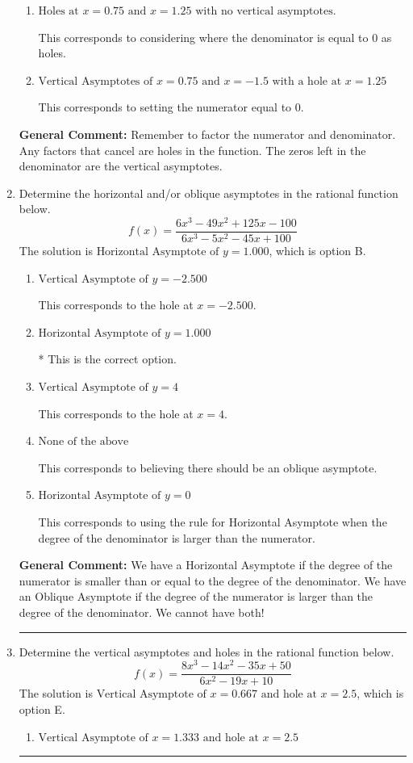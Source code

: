 \documentclass{extbook}[14pt]
\newcommand{\litem}[1]{\item #1

\rule{\textwidth}{0.4pt}}
\begin{document}
\begin{enumerate}
{\begin{enumerate}[label=\Alph*.]
This corresponds to mixing vertical and horizontal asymptotes.
\item \( \text{Holes at } x = 0.75 \text{ and } x = 1.25 \text{ with no vertical asymptotes.} \)

This corresponds to considering where the denominator is equal to 0 as holes.
\item \( \text{Vertical Asymptotes of } x = 0.75 \text{ and } x = -1.5 \text{ with a hole at } x = 1.25 \)

This corresponds to setting the numerator equal to 0.
\end{enumerate}

\textbf{General Comment:} Remember to factor the numerator and denominator. Any factors that cancel are holes in the function. The zeros left in the denominator are the vertical asymptotes.
}
\litem{
Determine the horizontal and/or oblique asymptotes in the rational function below.
\[ f(x) = \frac{6x^{3} -49 x^{2} +125 x -100}{6x^{3} -5 x^{2} -45 x + 100} \]The solution is \( \text{Horizontal Asymptote of } y = 1.000  \), which is option B.\begin{enumerate}[label=\Alph*.]
\item \( \text{Vertical Asymptote of } y = -2.500  \)

This corresponds to the hole at $x = -2.500$.
\item \( \text{Horizontal Asymptote of } y = 1.000  \)

* This is the correct option.
\item \( \text{Vertical Asymptote of } y = 4  \)

This corresponds to the hole at $x = 4$.
\item \( \text{None of the above} \)

This corresponds to believing there should be an oblique asymptote.
\item \( \text{Horizontal Asymptote of } y = 0  \)

This corresponds to using the rule for Horizontal Asymptote when the degree of the denominator is larger than the numerator.
\end{enumerate}

\textbf{General Comment:} We have a Horizontal Asymptote if the degree of the numerator is smaller than or equal to the degree of the denominator. We have an Oblique Asymptote if the degree of the numerator is larger than the degree of the denominator. We cannot have both!
}
\litem{
Determine the vertical asymptotes and holes in the rational function below.
\[ f(x) = \frac{8x^{3} -14 x^{2} -35 x + 50}{6x^{2} -19 x + 10} \]The solution is \( \text{Vertical Asymptote of } x = 0.667 \text{ and hole at } x = 2.5 \), which is option E.\begin{enumerate}[label=\Alph*.]
\item \( \text{Vertical Asymptote of } x = 1.333 \text{ and hole at } x = 2.5 \)


\end{enumerate}}
\end{enumerate}
\end{document}
